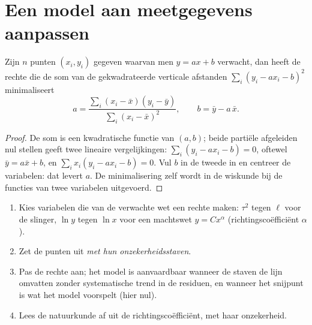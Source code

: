 \section{Een model aan meetgegevens aanpassen}

\begin{proposition}[Kleinstekwadratenlijn]\label{prop:b1:units-dimensions:regression}
Zijn $n$ punten $(x_i, y_i)$ gegeven waarvan men $y = a x + b$ verwacht, dan
heeft de rechte die de som van de gekwadrateerde verticale afstanden
$\sum_i (y_i - a x_i - b)^2$ minimaliseert
\[
a = \frac{\sum_i (x_i - \bar x)(y_i - \bar y)}{\sum_i (x_i - \bar x)^2},
\qquad
b = \bar y - a\,\bar x .
\]
\end{proposition}

\begin{proof}
De som is een kwadratische functie van $(a, b)$; beide partiële afgeleiden
nul stellen geeft twee lineaire vergelijkingen: $\sum_i (y_i - ax_i - b) = 0$,
oftewel $\bar y = a \bar x + b$, en $\sum_i x_i (y_i - ax_i - b) = 0$.
Vul $b$ in de tweede in en centreer de variabelen: dat levert $a$.
De minimalisering zelf wordt in de wiskunde bij de functies van twee
variabelen uitgevoerd.
\end{proof}

\begin{method}\label{met:b1:units-dimensions:fit}
\begin{enumerate}
  \item Kies variabelen die van de verwachte wet een rechte maken:
        $\tau^2$ tegen $\ell$ voor de slinger, $\ln y$ tegen
        $\ln x$ voor een machtswet $y = Cx^\alpha$ (richtingscoëfficiënt $\alpha$).
  \item Zet de punten uit \emph{met hun onzekerheidsstaven}.
  \item Pas de rechte aan; het model is aanvaardbaar wanneer de staven de
        lijn omvatten zonder systematische trend in de residuen, en wanneer
        het snijpunt is wat het model voorspelt (hier nul).
  \item Lees de natuurkunde af uit de richtingscoëfficiënt, met haar onzekerheid.
\end{enumerate}
\end{method}

